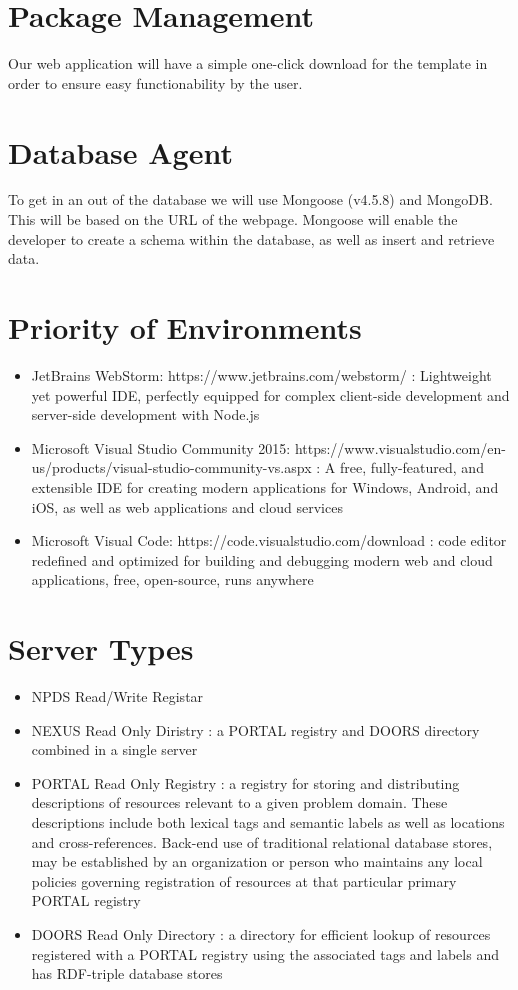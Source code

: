\documentclass[12pt]{article}
\begin{document}
\section{Package Management}
Our web application will have a simple one-click download for the template in order to ensure easy functionability by the user.

\section{Database Agent}
To get in an out of the database we will use Mongoose (v4.5.8) and MongoDB. This will be based on the URL of the webpage. Mongoose will enable the developer to create a schema within the database, as well as insert and retrieve data.

\section{Priority of Environments}
\begin{itemize}
	\item{JetBrains WebStorm: https://www.jetbrains.com/webstorm/}
	: Lightweight yet powerful IDE, perfectly equipped for complex client-side development and server-side development with Node.js
	\item{Microsoft Visual Studio Community 2015: https://www.visualstudio.com/en-us/products/visual-studio-community-vs.aspx}
	: A free, fully-featured, and extensible IDE for creating modern applications for Windows, Android, and iOS,
as well as web applications and cloud services
	\item{Microsoft Visual Code: https://code.visualstudio.com/download}
	: code editor redefined and optimized for building and debugging modern web and cloud applications, free, open-source, runs anywhere
\end{itemize}

\section{Server Types}
\begin{itemize}
	\item{NPDS Read/Write Registar}
	\item{NEXUS Read Only Diristry}
	: a PORTAL registry and DOORS directory combined in a single server
	\item{PORTAL Read Only Registry}
	: a registry for storing and distributing descriptions of resources relevant to a given problem domain. These descriptions include both lexical tags and semantic labels as well as locations and cross-references. Back-end use of traditional relational database stores, may be established by an organization or person who maintains any local policies governing registration of resources at that particular primary PORTAL registry
	\item{DOORS Read Only Directory}
	: a directory for efficient lookup of  resources registered with a PORTAL registry using the associated tags and labels and has RDF-triple database stores
\end{itemize}
\end{document}
